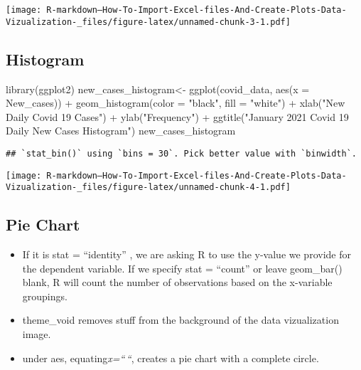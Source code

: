 \documentclass[
]{article}
\newenvironment{Shaded}{\begin{snugshade}}{\end{snugshade}}
\newcommand{\AttributeTok}[1]{\textcolor[rgb]{0.77,0.63,0.00}{#1}}
\newcommand{\FunctionTok}[1]{\textcolor[rgb]{0.00,0.00,0.00}{#1}}
\newcommand{\NormalTok}[1]{#1}
\newcommand{\OtherTok}[1]{\textcolor[rgb]{0.56,0.35,0.01}{#1}}
\newcommand{\SpecialCharTok}[1]{\textcolor[rgb]{0.00,0.00,0.00}{#1}}
\newcommand{\StringTok}[1]{\textcolor[rgb]{0.31,0.60,0.02}{#1}}
\begin{document}
\texttt{[image: R-markdown---How-To-Import-Excel-files-And-Create-Plots-Data-Vizualization-\_files/figure-latex/unnamed-chunk-3-1.pdf]}

\hypertarget{histogram}{%
\subsection{Histogram}\label{histogram}}

\begin{Shaded}
\begin{Highlighting}[]
\FunctionTok{library}\NormalTok{(ggplot2)}
\NormalTok{new\_cases\_histogram}\OtherTok{\textless{}{-}} \FunctionTok{ggplot}\NormalTok{(covid\_data, }\FunctionTok{aes}\NormalTok{(}\AttributeTok{x =}\NormalTok{ New\_cases)) }\SpecialCharTok{+} \FunctionTok{geom\_histogram}\NormalTok{(}\AttributeTok{color =} \StringTok{"black"}\NormalTok{, }\AttributeTok{fill =} \StringTok{"white"}\NormalTok{) }\SpecialCharTok{+} \FunctionTok{xlab}\NormalTok{(}\StringTok{"New Daily Covid 19 Cases"}\NormalTok{) }\SpecialCharTok{+} \FunctionTok{ylab}\NormalTok{(}\StringTok{"Frequency"}\NormalTok{) }\SpecialCharTok{+} \FunctionTok{ggtitle}\NormalTok{(}\StringTok{"January 2021 Covid 19 Daily New Cases Histogram"}\NormalTok{)}
\NormalTok{new\_cases\_histogram}
\end{Highlighting}
\end{Shaded}

\begin{verbatim}
## `stat_bin()` using `bins = 30`. Pick better value with `binwidth`.
\end{verbatim}

\texttt{[image: R-markdown---How-To-Import-Excel-files-And-Create-Plots-Data-Vizualization-\_files/figure-latex/unnamed-chunk-4-1.pdf]}

\hypertarget{pie-chart}{%
\subsection{Pie Chart}\label{pie-chart}}

\begin{itemize}
\item
  If it is stat = ``identity'' , we are asking R to use the y-value we
  provide for the dependent variable. If we specify stat = ``count'' or
  leave geom\_bar() blank, R will count the number of observations based
  on the x-variable groupings.
\item
  theme\_void removes stuff from the background of the data
  vizualization image.
\item
  under aes, equating\emph{x=``\,``}, creates a pie chart with a
  complete circle.
\end{itemize}
\end{document}
